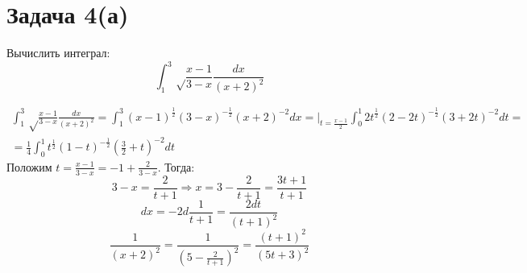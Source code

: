 \documentclass[11pt]{article}
\author{Sergey Makarov}
\date{\today}
\title{}
\begin{document}
\section{Задача 4(а)}
\label{sec:org6bda04a}
Вычислить интеграл:
$$\int_1^3\sqrt\frac{x - 1}{3 - x}\frac{dx}{(x + 2)^2}$$

\begin{multline*}
\int_1^3\sqrt\frac{x - 1}{3 - x}\frac{dx}{(x + 2)^2} = \int_1^3(x - 1)^{\frac12}(3 - x)^{-\frac12}(x + 2)^{-2}dx
=\bigg|_{t = \frac{x - 1}2}\int_0^1{2t}^\frac12(2 - 2t)^{-\frac12}(3 + 2t)^{-2}dt = \\
= \frac14\int_0^1t^{\frac12}(1 - t)^{-\frac12}\left(\frac32 + t\right)^{-2}dt
\end{multline*}
Положим \(t = \frac{x - 1}{3 - x} = -1 + \frac{2}{3 - x}\). Тогда:
$$3 - x = \frac2{t + 1} \Rightarrow x = 3 - \frac2{t + 1} = \frac{3t + 1}{t + 1}$$
$$dx = -2d{\frac1{t + 1}} = \frac{2dt}{(t + 1)^2}$$
$$\frac1{(x + 2)^2} = \frac1{\left(5 - \frac2{t + 1}\right)^2} = \frac{(t + 1)^2}{(5t + 3)^2}$$
\end{document}
